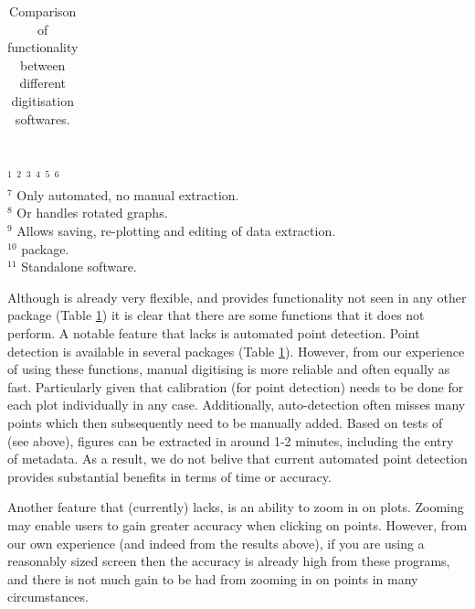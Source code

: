 \documentclass[article]{jss}
\begin{document}
\begin{table}
{\begin{tabular}{lccccccc}

\end{tabular}
}
{\footnotesize
\\
$^1$ \citet{GraphClick}
$^2$ \citet{DataThief}
$^3$ \citet{DigitizeIt}
$^4$ \citet{WebPlotDigitizer}
$^5$ \citet{Lajeunesse2016}
$^6$ \citet{Poisot2011}
\\$^7$ Only automated, no manual extraction.
\\$^8$ Or handles rotated graphs. 
\\$^9$ Allows saving, re-plotting and editing of data extraction.
\\$^{10}$  package.
\\$^{11}$ Standalone software.
}

\caption{\label{tab:comparison} Comparison of functionality between different digitisation softwares.}

\end{table}


Although  is already very flexible, and provides functionality not seen in any other package (Table \ref{tab:comparison}) it is clear that there are some functions that it does not perform. A notable feature that  lacks is automated point detection. Point detection is available in several packages (Table \ref{tab:comparison}). However, from our experience of using these functions, manual digitising is more reliable and often equally as fast. Particularly given that calibration (for point detection) needs to be done for each plot individually in any case. Additionally, auto-detection often misses many points which then subsequently need to be manually added. Based on tests of  (see above), figures can be extracted in around 1-2 minutes, including the entry of metadata. As a result, we do not belive that current automated point detection provides substantial benefits in terms of time or accuracy.

Another feature that  (currently) lacks, is an ability to zoom in on plots. Zooming may enable users to gain greater accuracy when clicking on points. However, from our own experience (and indeed from the results above), if you are using a reasonably sized screen then the accuracy is already high from these programs, and there is not much gain to be had from zooming in on points in many circumstances.
\end{document}
